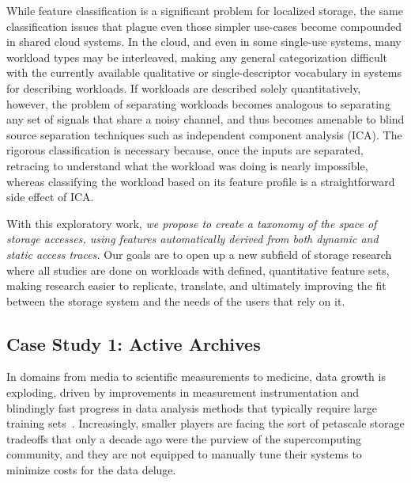 While feature classification is a significant problem for localized storage, the
same classification issues that plague even those simpler use-cases become
compounded in shared cloud systems. In the cloud, and even in some single-use systems, many workload types may be interleaved, making any general
categorization difficult with the currently available qualitative or
single-descriptor vocabulary in systems for describing workloads.  If workloads
are described solely quantitatively, however, the problem of separating
workloads becomes analogous to separating any set of signals that share a noisy
channel, and thus becomes amenable to blind source separation techniques such as
independent component analysis (ICA).  The rigorous classification is necessary
because, once the inputs are separated, retracing to understand what the
workload was doing is nearly impossible, whereas classifying the workload based
on its feature profile is a straightforward side effect of ICA.  

With this exploratory work, \textit{we propose to create a taxonomy of the space of storage accesses, using features automatically derived from both
dynamic and static access traces.}
Our goals are to open up a new subfield of storage research where all studies
are done on workloads with defined, quantitative feature sets, making research
easier to replicate, translate, and ultimately improving the fit between the
storage system and the needs of the users that rely on it.%

\subsection{Case Study 1: Active Archives}
In domains from media to scientific measurements to medicine, data growth is exploding, driven by
improvements in measurement instrumentation and blindingly fast progress in data
analysis methods that typically require large training sets~\cite{raghupathi2014big,gantz2012digital,chen2014big}.
Increasingly, smaller players are facing the sort of petascale storage tradeoffs
that only a decade ago were the purview of the supercomputing community, and
they are not equipped to manually tune their systems to minimize costs for the
data deluge.  

